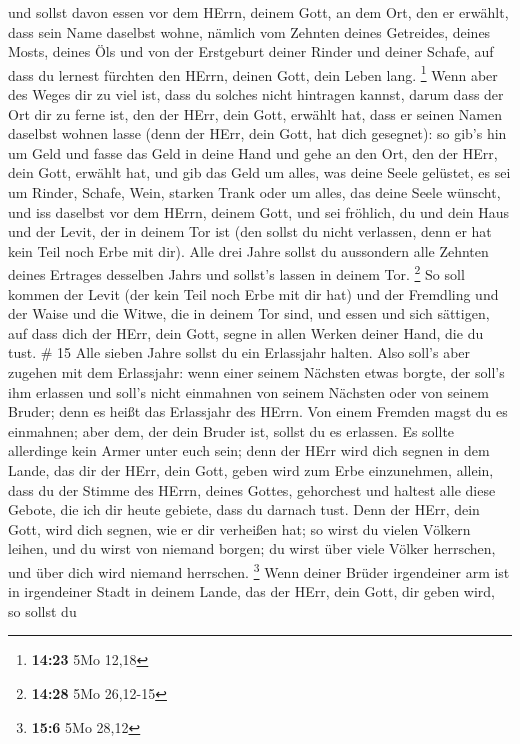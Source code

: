  und sollst davon essen vor dem HErrn, deinem Gott, an dem
Ort, den er erwählt, dass sein Name daselbst wohne, nämlich vom Zehnten
deines Getreides, deines Mosts, deines Öls und von der Erstgeburt deiner
Rinder und deiner Schafe, auf dass du lernest fürchten den HErrn, deinen
Gott, dein Leben lang. \footnote{\textbf{14:23} 5Mo 12,18} 
Wenn aber des Weges dir zu viel ist, dass du solches nicht hintragen
kannst, darum dass der Ort dir zu ferne ist, den der HErr, dein Gott,
erwählt hat, dass er seinen Namen daselbst wohnen lasse (denn der HErr,
dein Gott, hat dich gesegnet):  so gib's hin um Geld und
fasse das Geld in deine Hand und gehe an den Ort, den der HErr, dein
Gott, erwählt hat,  und gib das Geld um alles, was deine
Seele gelüstet, es sei um Rinder, Schafe, Wein, starken Trank oder um
alles, das deine Seele wünscht, und iss daselbst vor dem HErrn, deinem
Gott, und sei fröhlich, du und dein Haus  und der Levit,
der in deinem Tor ist (den sollst du nicht verlassen, denn er hat kein
Teil noch Erbe mit dir).  Alle drei Jahre sollst du
aussondern alle Zehnten deines Ertrages desselben Jahrs und sollst's
lassen in deinem Tor. \footnote{\textbf{14:28} 5Mo 26,12-15}
 So soll kommen der Levit (der kein Teil noch Erbe mit dir
hat) und der Fremdling und der Waise und die Witwe, die in deinem Tor
sind, und essen und sich sättigen, auf dass dich der HErr, dein Gott,
segne in allen Werken deiner Hand, die du tust. \# 15  Alle
sieben Jahre sollst du ein Erlassjahr halten.  Also soll's
aber zugehen mit dem Erlassjahr: wenn einer seinem Nächsten etwas
borgte, der soll's ihm erlassen und soll's nicht einmahnen von seinem
Nächsten oder von seinem Bruder; denn es heißt das Erlassjahr des HErrn.
 Von einem Fremden magst du es einmahnen; aber dem, der dein
Bruder ist, sollst du es erlassen.  Es sollte allerdinge
kein Armer unter euch sein; denn der HErr wird dich segnen in dem Lande,
das dir der HErr, dein Gott, geben wird zum Erbe einzunehmen,
 allein, dass du der Stimme des HErrn, deines Gottes,
gehorchest und haltest alle diese Gebote, die ich dir heute gebiete,
dass du darnach tust.  Denn der HErr, dein Gott, wird dich
segnen, wie er dir verheißen hat; so wirst du vielen Völkern leihen, und
du wirst von niemand borgen; du wirst über viele Völker herrschen, und
über dich wird niemand herrschen. \footnote{\textbf{15:6} 5Mo 28,12}
 Wenn deiner Brüder irgendeiner arm ist in irgendeiner Stadt
in deinem Lande, das der HErr, dein Gott, dir geben wird, so sollst du
